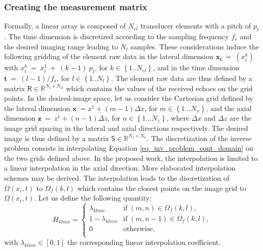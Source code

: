 \documentclass[conference]{IEEEtran}
\begin{document}
\subsubsection{Creating the measurement matrix}
\label{subsubsec:meas_model}
Formally, a linear array is composed of $N_{el}$ transducer elements with a pitch of $p_t$. The time dimension is discretized according to the sampling frequency $f_s$ and the desired imaging range leading to $N_t$ samples. These considerations induce the following gridding of the element raw data in the lateral dimension $\bm{x_i} ~=~\left( x_i^k\right)$ with $x_i^k~=~x_i^1~+~\left(k-1\right)~p_t$, for $k \in \left\lbrace1..N_{el} \right\rbrace$, and in the time dimension $\bm{t}~=~ (l-1)/f_s$, for $l \in \left\lbrace 1..N_t \right\rbrace$. The element raw data are thus defined by a matrix $\mathsf{R} \in \mathbb{R}^{N_t \times N_{el}}$ which contains the values of the received echoes on the grid points.
In the desired-image space, let us consider the Cartesian grid defined by the lateral dimension $\bm{x}~= x^1 + (m-1) \Delta x$, for $m \in \left\lbrace1...N_x\right\rbrace$, and the axial dimension $\bm{z}~=~z^1 + (n-1) \Delta z$, for $n \in \left\lbrace 1...N_z \right\rbrace$,  where $\Delta x$ and $\Delta z$ are the image grid spacing in the lateral and axial directions respectively. The desired image is thus defined by a matrix $\mathsf{S} \in \mathbb{R}^{N_z \times N_x}$.
The discretization of the inverse problem consists in interpolating Equation \eqref{eq_inv_problem_cont_domain} on the two grids defined above. In the proposed work, the interpolation is limited to a linear interpolation in the axial direction. More elaborated interpolation schemes may be derived. The interpolation leads to the discretization of $\Omega \left(x_i, t\right)$ to $\Omega_f \left(k, l\right)$ which contains the closest points on the image grid to $\Omega \left(x_i, t\right)$. Let us define the following quantity:
\begin{equation}
\label{eq_Hijkl}
H_{klmn} = \left\lbrace
\begin{array}{ll}
\lambda_{klmn}&\text{if} \; (m, n) \in \Omega_f \left(k, l\right),\\
1 - \lambda_{klmn}&\text{if} \; (m, n-1) \in \Omega_f \left(k, l\right),\\
0&\text{otherwise}, \\
\end{array} \right.
\end{equation}
with $\lambda_{klmn} \in \left[0,1\right]$ the corresponding linear interpolation coefficient. 
\end{document}
